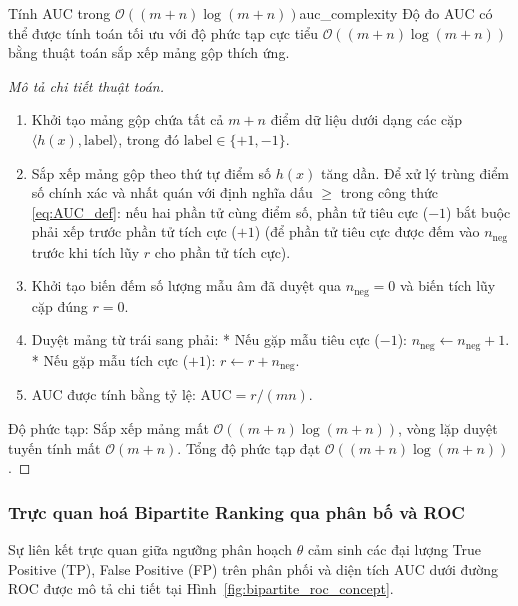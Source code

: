 \begin{theorem}{Tính AUC trong $\mathcal{O}((m+n)\log(m+n))$}{auc_complexity}
Độ đo AUC có thể được tính toán tối ưu với độ phức tạp cực tiểu $\mathcal{O}((m+n)\log(m+n))$ bằng thuật toán sắp xếp mảng gộp thích ứng.
\end{theorem}

\begin{proof}[Mô tả chi tiết thuật toán]
\begin{enumerate}
    \item Khởi tạo mảng gộp chứa tất cả $m + n$ điểm dữ liệu dưới dạng các cặp $\langle h(x), \text{label} \rangle$, trong đó $\text{label} \in \{+1, -1\}$.
    \item Sắp xếp mảng gộp theo thứ tự điểm số $h(x)$ tăng dần. Để xử lý trùng điểm số chính xác và nhất quán với định nghĩa dấu $\geq$ trong công thức \eqref{eq:AUC_def}: nếu hai phần tử cùng điểm số, phần tử tiêu cực ($-1$) bắt buộc phải xếp trước phần tử tích cực ($+1$) (để phần tử tiêu cực được đếm vào $n_{\text{neg}}$ trước khi tích lũy $r$ cho phần tử tích cực).
    \item Khởi tạo biến đếm số lượng mẫu âm đã duyệt qua $n_{\text{neg}} = 0$ và biến tích lũy cặp đúng $r = 0$.
    \item Duyệt mảng từ trái sang phải:
          * Nếu gặp mẫu tiêu cực ($-1$): $n_{\text{neg}} \leftarrow n_{\text{neg}} + 1$.
          * Nếu gặp mẫu tích cực ($+1$): $r \leftarrow r + n_{\text{neg}}$.
    \item AUC được tính bằng tỷ lệ: $\mathrm{AUC} = r / (mn)$.
\end{enumerate}
Độ phức tạp: Sắp xếp mảng mất $\mathcal{O}((m+n)\log(m+n))$, vòng lặp duyệt tuyến tính mất $\mathcal{O}(m+n)$. Tổng độ phức tạp đạt $\mathcal{O}((m+n)\log(m+n))$.
\end{proof}

\subsubsection{Trực quan hoá Bipartite Ranking qua phân bố và ROC}

Sự liên kết trực quan giữa ngưỡng phân hoạch $\theta$ cảm sinh các đại lượng True Positive (TP), False Positive (FP) trên phân phối và diện tích AUC dưới đường ROC được mô tả chi tiết tại Hình~\ref{fig:bipartite_roc_concept}.

